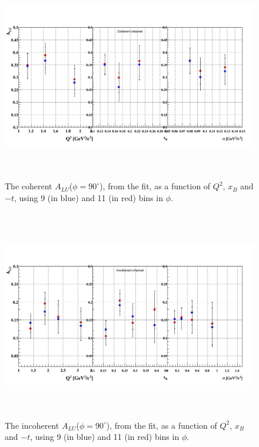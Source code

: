 \begin{figure}[tbp]
   \centering
      \includegraphics[height=9.2cm]{fig/BSA_Coherent_9_11.png}
      \caption{The coherent $A_{LU}$($\phi = 90 ^{\circ}$), from the fit, as a 
      function of $Q^{2}$, $x_B$ and $-t$, using 9 (in blue) and 11 (in red) 
   bins in $\phi$.}
      \label{fig:coh_BSA_9_11}
    \end{figure}

\begin{figure}[tbp]
   \centering
      \includegraphics[height=9.2cm]{fig/BSA_InCoherent_9_11.png}
      \caption{The incoherent $A_{LU}$($\phi = 90 ^{\circ}$), from the fit, as 
         a function of $Q^{2}$, $x_B$ and $-t$, using 9 (in blue) and 11 (in 
      red) bins in $\phi$. }
      \label{fig:incoh_BSA_9_11}
    \end{figure}


